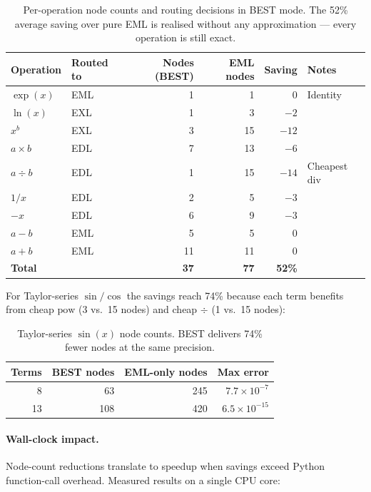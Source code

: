 \documentclass[11pt,a4paper]{article}
\begin{document}
\begin{table}[h]
\centering
\begin{tabular}{@{}llrrrl@{}}
\toprule
Operation & Routed to & Nodes (BEST) & EML nodes & Saving & Notes \\
\midrule
$\exp(x)$   & EML & 1  & 1  &  0 & Identity \\
$\ln(x)$    & EXL & 1  & 3  & $-2$ & \\
$x^b$       & EXL & 3  & 15 & $-12$ & \\
$a\times b$ & EDL & 7  & 13 & $-6$ & \\
$a\div b$   & EDL & 1  & 15 & $-14$ & Cheapest div \\
$1/x$       & EDL & 2  & 5  & $-3$ & \\
$-x$        & EDL & 6  & 9  & $-3$ & \\
$a - b$     & EML & 5  & 5  &  0 & \\
$a + b$     & EML & 11 & 11 &  0 & \\
\midrule
\textbf{Total} & & \textbf{37} & \textbf{77} & \textbf{52\%} & \\
\bottomrule
\end{tabular}
\caption{Per-operation node counts and routing decisions in BEST mode.
  The 52\% average saving over pure EML is realised without any
  approximation --- every operation is still exact.}
\end{table}

For Taylor-series $\sin/\cos$ the savings reach 74\% because each term
benefits from cheap $\mathrm{pow}$ (3 vs.\ 15 nodes) and cheap
$\div$ (1 vs.\ 15 nodes):

\begin{table}[h]
\centering
\begin{tabular}{@{}rrrr@{}}
\toprule
Terms & BEST nodes & EML-only nodes & Max error \\
\midrule
8  & 63  & 245 & $7.7\times10^{-7}$ \\
13 & 108 & 420 & $6.5\times10^{-15}$ \\
\bottomrule
\end{tabular}
\caption{Taylor-series $\sin(x)$ node counts.  BEST delivers 74\% fewer
  nodes at the same precision.}
\end{table}

\paragraph{Wall-clock impact.}
Node-count reductions translate to speedup when savings exceed Python
function-call overhead.  Measured results on a single CPU core:
\end{document}
